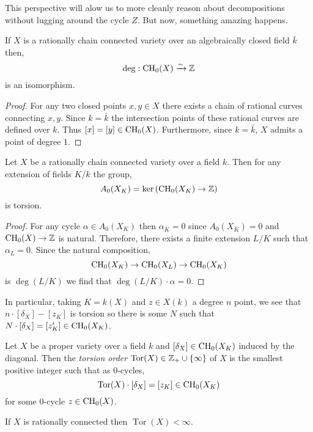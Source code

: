 \documentclass[12pt]{article}
\DeclareMathOperator{\torsion}{\mathrm{Tor}}
\begin{document}
This perspective will alow us to more cleanly reason about decompositions without lugging around the cycle $Z$. But now, something amazing happens.

\begin{lemma}
If $X$ is a rationally chain connected variety over an algebraically closed field $\bar{k}$ then,
\[ \deg : \mathrm{CH}_0(X) \xrightarrow{\sim} \mathbb{Z} \]
is an isomorphism.
\end{lemma} 

\begin{proof}
For any two closed points $x, y \in X$ there exists a chain of rational curves connecting $x, y$. Since $k = \bar{k}$ the intersection points of these rational curves are defined over $k$. Thus $[x] = [y] \in \mathrm{CH}_0(X)$. Furthermore, since $k = \bar{k}$, $X$ admits a point of degree $1$.
\end{proof}

\begin{cor}
Let $X$ be a rationally chain connected variety over a field $k$. Then for any extension of fields $K / k$ the group,
\[ A_0(X_K) = \ker{(\mathrm{CH}_0(X_K) \to \mathbb{Z})} \]
is torsion.
\end{cor}

\begin{proof}
For any cycle $\alpha \in A_0(X_K)$ then $\alpha_{\bar{K}} = 0$ since $A_0(X_{\bar{K}}) = 0$ and $\mathrm{CH}_0(X) \to \mathbb{Z}$ is natural. Therefore, there exists a finite extension $L / K$ such that $\alpha_{L} = 0$. Since the natural composition,
\[ \mathrm{CH}_0(X_K) \to \mathrm{CH}_0(X_{L}) \to \mathrm{CH}_0(X_K) \]
is $\deg{(L/K)}$ we find that $\deg{(L/K)} \cdot \alpha = 0$.
\end{proof}

\begin{cor}
In particular, taking $K = k(X)$ and $z \in X(k)$ a degree $n$ point, we see that $n \cdot [\delta_X] - [z_K]$ is torsion so there is some $N$ such that $N \cdot [\delta_X] = [z'_K] \in \mathrm{CH}_0(X_K)$.
\end{cor}

\begin{defn}
Let $X$ be a proper variety over a field $k$ and $[\delta_X] \in \mathrm{CH}_0(X_K)$ induced by the diagonal. Then the \textit{torsion order} $\torsion(X) \in \Z_{+} \cup \{ \infty \}$ of $X$ is the smallest positive integer such that as $0$-cycles,
\[ \torsion(X) \cdot [\delta_X] = [z_K] \in \CH_0(X_K) \]
for some $0$-cycle $z \in \mathrm{CH}_0(X)$. 
\end{defn}

\begin{cor}
If $X$ is rationally connected then $\torsion(X) < \infty$.
\end{cor}
\end{document}
